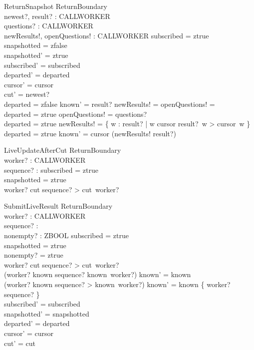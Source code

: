 \documentclass[a4paper,10pt,fleqn]{article}
\begin{document}
\begin{schema}{ReturnSnapshot}
  \Delta ReturnBoundary \\
  newest?, result? : CALLWORKER \pfun \nat \\
  questions? : \power CALLWORKER \\
  newResults!, openQuestions! : \power CALLWORKER
\where
  subscribed = ztrue \\
  snapshotted = zfalse \\
  snapshotted' = ztrue \\
  subscribed' = subscribed \\
  departed' = departed \\
  cursor' = cursor \\
  cut' = newest? \\
  departed = zfalse \implies
    known' = result? \land
    newResults! = \emptyset \land openQuestions! = \emptyset \\
  departed = ztrue \implies openQuestions! = questions? \\
  departed = ztrue \implies newResults! =
    \{ w : \dom result? | w \notin \dom cursor \lor result?~w > cursor~w \} \\
  departed = ztrue \implies known' = cursor \oplus (newResults! \dres result?)
\end{schema}

\begin{schema}{LiveUpdateAfterCut}
  \Xi ReturnBoundary \\
  worker? : CALLWORKER \\
  sequence? : \nat
\where
  subscribed = ztrue \\
  snapshotted = ztrue \\
  worker? \notin \dom cut \lor sequence? > cut~worker?
\end{schema}

\begin{schema}{SubmitLiveResult}
  \Delta ReturnBoundary \\
  worker? : CALLWORKER \\
  sequence? : \nat \\
  nonempty? : ZBOOL
\where
  subscribed = ztrue \\
  snapshotted = ztrue \\
  nonempty? = ztrue \\
  worker? \notin \dom cut \lor sequence? > cut~worker? \\
  (worker? \in \dom known \land sequence? \leq known~worker?) \implies known' = known \\
  (worker? \notin \dom known \lor sequence? > known~worker?) \implies
    known' = known \oplus \{ worker? \mapsto sequence? \} \\
  subscribed' = subscribed \\
  snapshotted' = snapshotted \\
  departed' = departed \\
  cursor' = cursor \\
  cut' = cut
\end{schema}
\end{document}
